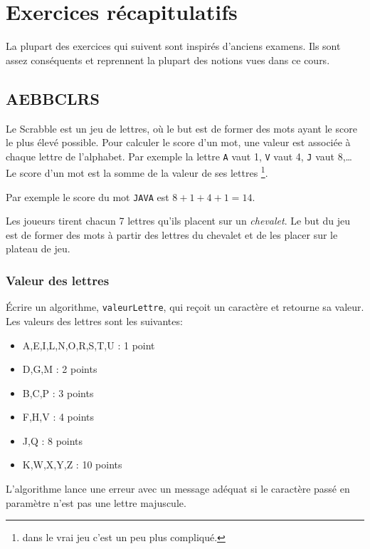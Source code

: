 \chapter{Exercices récapitulatifs}

	La plupart des exercices qui suivent sont inspirés
	d'anciens examens.
	Ils sont assez conséquents et reprennent
	la plupart des notions vues dans ce cours.

	\section{AEBBCLRS}

		Le Scrabble est un jeu de lettres, 
		où le but est de former des mots ayant le score le plus élevé possible.
		Pour calculer le score d'un mot, 
		une valeur est associée à chaque lettre de l'alphabet. 
		Par exemple la lettre \texttt{A} vaut 1, \texttt{V} vaut 4, 
		\texttt{J} vaut 8,\dots{}
		Le score d'un mot est la somme de la valeur de ses lettres%
		\footnote{dans le vrai jeu c'est un peu plus compliqué.}.

		Par exemple le score du mot \texttt{JAVA} est $8+1+4+1 = 14$.

		Les joueurs tirent chacun 7 lettres qu'ils placent sur un \emph{chevalet}.
		Le but du jeu est de former des mots à partir des lettres du chevalet et de les placer sur le plateau de jeu.
	
		\subsection*{Valeur des lettres}
	
			\'Ecrire un algorithme, \texttt{valeurLettre}, 
			qui reçoit un caractère et retourne sa valeur. 
			Les valeurs des lettres sont les suivantes: 
			\begin{itemize}
			\item A,E,I,L,N,O,R,S,T,U : 1 point
			\item D,G,M : 2 points
			\item B,C,P : 3 points
			\item F,H,V : 4 points
			\item J,Q : 8 points
			\item K,W,X,Y,Z : 10 points
			\end{itemize}	

			L'algorithme lance une erreur avec un message adéquat 
			si le caractère passé en paramètre n'est pas une lettre majuscule.  
	
